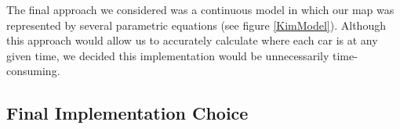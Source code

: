 \documentclass[11pt]{article}
\begin{document}
	The final approach we considered was a continuous model in which our map was represented by several parametric equations (see figure \ref{KimModel}). 
	Although this approach would allow us to accurately calculate where each car is at any given time, we decided this implementation would be unnecessarily time-consuming.  
	

\subsection{Final Implementation Choice}

	
	
	
\end{document}
